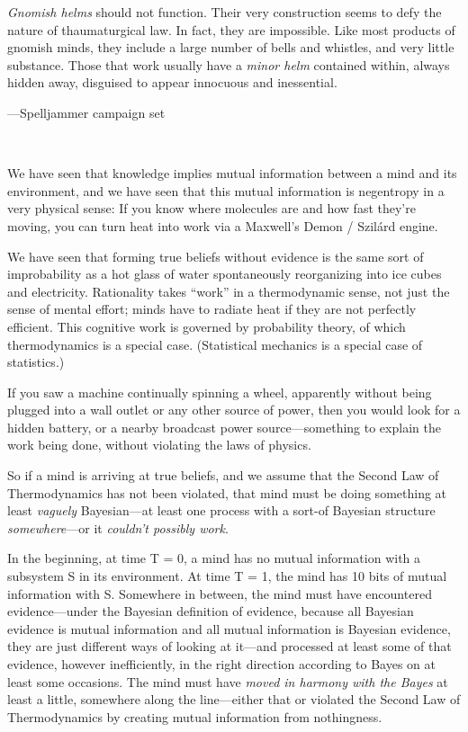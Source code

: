 \myendsectiontext


{
 \textit{Gnomish helms} should not function. Their very
construction seems to defy the nature of thaumaturgical law. In fact,
they are impossible. Like most products of gnomish minds, they include
a large number of bells and whistles, and very little substance. Those
that work usually have a \textit{minor helm} contained within, always
hidden away, disguised to appear innocuous and inessential.}

{\raggedleft
 {}---Spelljammer campaign set
\par}


\bigskip

{
 ~}

{
 We have seen that knowledge implies mutual information between a
mind and its environment, and we have seen that this mutual information
is negentropy in a very physical sense: If you know where molecules are
and how fast they're moving, you can turn heat into
work via a Maxwell's Demon / Szilárd engine.}

{
 We have seen that forming true beliefs without evidence is the
same sort of improbability as a hot glass of water spontaneously
reorganizing into ice cubes and electricity. Rationality takes
``work'' in a thermodynamic sense,
not just the sense of mental effort; minds have to radiate heat if they
are not perfectly efficient. This cognitive work is governed by
probability theory, of which thermodynamics is a special case.
(Statistical mechanics is a special case of statistics.)}

{
 If you saw a machine continually spinning a wheel, apparently
without being plugged into a wall outlet or any other source of power,
then you would look for a hidden battery, or a nearby broadcast power
source---something to explain the work being done, without violating
the laws of physics.}

{
 So if a mind is arriving at true beliefs, and we assume that the
Second Law of Thermodynamics has not been violated, that mind must be
doing something at least \textit{vaguely} Bayesian---at least one
process with a sort-of Bayesian structure \textit{somewhere}{}---or it
\textit{couldn't possibly work}.}

{
 In the beginning, at time T = 0, a mind has no mutual information
with a subsystem S in its environment. At time T = 1, the mind has 10
bits of mutual information with S. Somewhere in between, the mind must
have encountered evidence---under the Bayesian definition of evidence,
because all Bayesian evidence is mutual information and all mutual
information is Bayesian evidence, they are just different ways of
looking at it---and processed at least some of that evidence, however
inefficiently, in the right direction according to Bayes on at least
some occasions. The mind must have \textit{moved in harmony with the
Bayes} at least a little, somewhere along the line---either that or
violated the Second Law of Thermodynamics by creating mutual
information from nothingness.}

